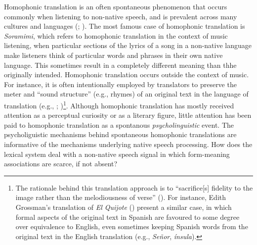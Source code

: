 \documentclass[
]{article}
\begin{document}
Homophonic translation is an often spontaneous phenomenon that occurs
commonly when listening to non-native speech, and is prevalent across
many cultures and languages
(;
). The most
famous case of homophonic translation is \emph{Soramimi}, which refers
to homophonic translation in the context of music listening, when
particular sections of the lyrics of a song in a non-native language
make listeners think of particular words and phrases in their own native
language. This sometimes result in a completely different meaning than
thhe originally intended. Homophonic translation occurs outside the
context of music. For instance, it is often intentionally employed by
translators to preserve the meter and ``sound structure'' (e.g., rhymes)
of an original text in the language of translation (e.g.,
;
)\footnote{The
  rationale behind this translation approach is to ``sacrifice{[}s{]}
  fidelity to the image rather than the melodiousness of verse''
  (). For instance, Edith
  Grossman's translation of \emph{El Quijote}
  () present a
  similar case, in which formal aspects of the original text in Spanish
  are favoured to some degree over equivalence to English, even
  sometimes keeping Spanish words from the original text in the English
  translation (e.g., \emph{Señor}, \emph{ínsula}).}. Although homophonic
translation has mostly received attention as a perceptual curiosity or
as a literary figure, little attention has been paid to homophonic
translation as a spontanous \emph{psycholinguistic} event. The
psycholiguistic mechanisms behind spontaneous homophonic translations
are informative of the mechanisms underlying native speech processing.
How does the lexical system deal with a non-native speech signal in
which form-meaning associations are scarce, if not absent?
\end{document}
